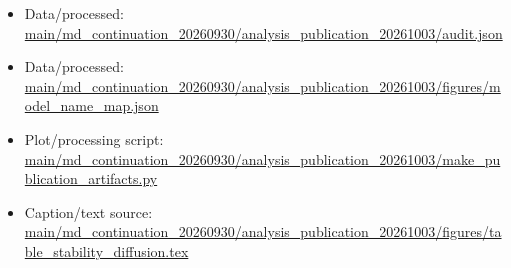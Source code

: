 \begin{itemize}[leftmargin=1.4em,noitemsep]
\item Data/processed: \begingroup\scriptsize\url{main/md_continuation_20260930/analysis_publication_20261003/audit.json}\endgroup
\item Data/processed: \begingroup\scriptsize\url{main/md_continuation_20260930/analysis_publication_20261003/figures/model_name_map.json}\endgroup
\item Plot/processing script: \begingroup\scriptsize\url{main/md_continuation_20260930/analysis_publication_20261003/make_publication_artifacts.py}\endgroup
\item Caption/text source: \begingroup\scriptsize\url{main/md_continuation_20260930/analysis_publication_20261003/figures/table_stability_diffusion.tex}\endgroup
\end{itemize}
